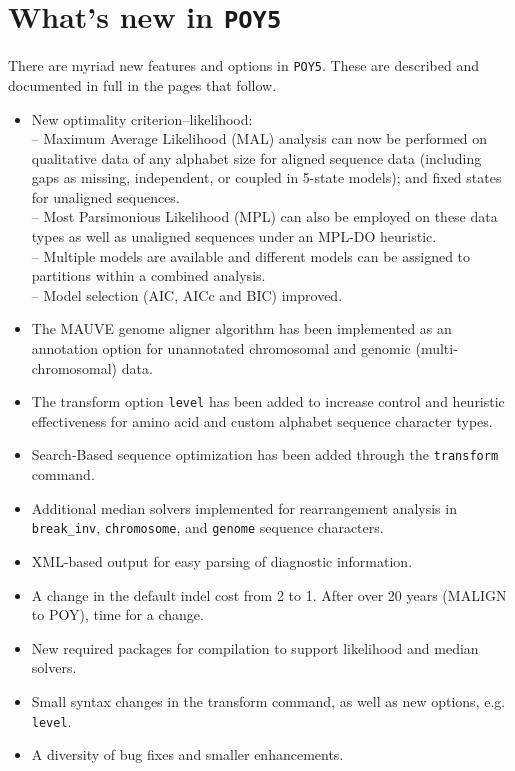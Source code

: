 \documentclass[11pt]{book}
\newcommand{\commandstyle}[1]{\texttt{#1}}
\newcommand{\poyargument}[1]{\commandstyle{#1}}
\newcommand{\poy}{\commandstyle{POY5}\xspace}
\begin{document}
\section{What's new in \poy}
There are myriad new features and options in \poy.  These are described and documented 
in full in the pages that follow.  
\begin{itemize}
\item{New optimality criterion--likelihood:\\
	-- Maximum Average Likelihood (MAL) analysis can now be performed on qualitative 
	data of any alphabet size for aligned sequence data (including gaps as missing, independent, 
	or coupled in 5-state models); and fixed states for unaligned sequences.\\  
	-- Most Parsimonious Likelihood (MPL) can also be employed on these data types as well 
	as unaligned sequences under an MPL-DO heuristic.\\
	-- Multiple models are available and different models can be assigned to partitions within 
	a combined analysis.\\
	-- Model selection (AIC, AICc and BIC) improved.}
\item{The MAUVE genome aligner algorithm has been implemented as an annotation option
for unannotated chromosomal and genomic (multi-chromosomal) data.}
\item{The transform option \texttt{level} has been added to increase control and heuristic 
effectiveness for amino acid and custom alphabet sequence character types.}
\item{Search-Based sequence optimization has been added through the \texttt{transform} 
command.}
\item{Additional median solvers implemented for rearrangement analysis in \texttt{break\_inv}, 
\texttt{chromosome}, and \texttt{genome} sequence characters.}
\item{XML-based output for easy parsing of diagnostic information.}
\item{A change in the default indel cost from 2 to 1.  After over 20 years (MALIGN to POY), 
time for a change.}
\item{New required packages for compilation to support likelihood and median solvers.}
\item{Small syntax changes in the transform command, as well as new options, e.g. 
\poyargument{level}.}
\item{A diversity of bug fixes and smaller enhancements.}
\end{itemize}
\end{document}
